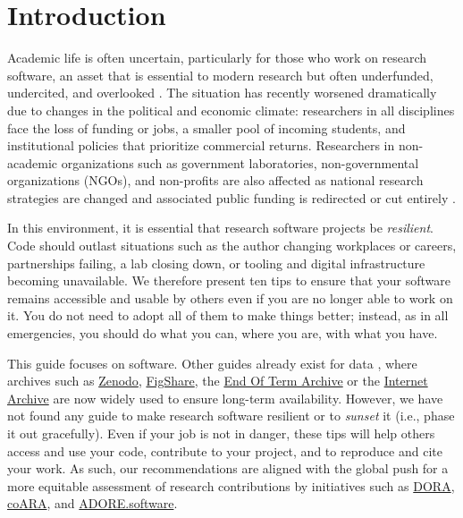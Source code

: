 \documentclass[10pt,letterpaper]{article}
\begin{document}
\linenumbers

\section*{Introduction}

Academic life is often uncertain, particularly for those who work on research software, an asset that is essential to modern research \cite{Pearson2025} but often underfunded, undercited, and overlooked \cite{Carver2022}.
The situation has recently worsened dramatically due to changes in the political and economic climate: researchers in all disciplines face the loss of funding or jobs, a smaller pool of incoming students, and institutional policies that prioritize commercial returns.
Researchers in non-academic organizations such as government laboratories, non-governmental organizations (NGOs), and non-profits are also affected \cite{Woodward2025} as national research strategies are changed and associated public funding is redirected or cut entirely \cite{Nature2025}.

In this environment, it is essential that research software projects be \emph{resilient}.
Code should outlast situations such as the author changing workplaces or careers,
partnerships failing, a lab closing down, or tooling and digital infrastructure becoming unavailable.
We therefore present ten tips to ensure that your software remains accessible and usable by others
even if you are no longer able to work on it. 
You do not need to adopt all of them to make things better; instead, as in all emergencies, you should do what you can, where you are, with what you have.

This guide focuses on software.
Other guides already exist for data \cite{Perkel2023},
where archives such as \href{https://zenodo.org/}{Zenodo},
\href{https://figshare.com/}{FigShare},
the \href{https://eotarchive.org/}{End Of Term Archive}
or the \href{http://archive.org/}{Internet Archive} are now widely used to ensure long-term availability.
However, we have not found any guide to make research software resilient or to \emph{sunset} it (i.e., phase it out gracefully).
Even if your job is not in danger, these tips will help others access and use your code, contribute to your project, and to reproduce and cite your work.
As such, our recommendations are aligned with the global push for a more equitable assessment of research contributions by initiatives such as \href{https://sfdora.org/}{DORA},
\href{https://coara.eu/}{coARA}, and \href{https://adore.software/}{ADORE.software}.
\end{document}
